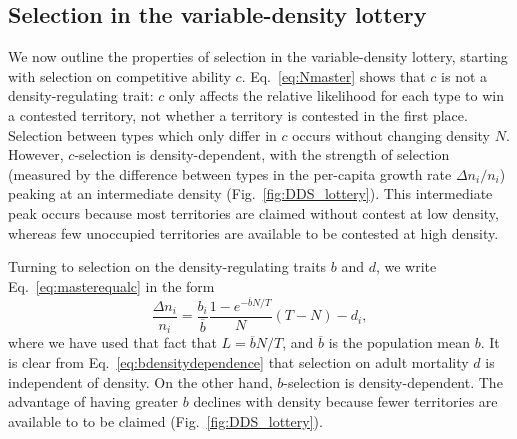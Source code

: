 \documentclass[12pt]{article}
\begin{document}
\subsection*{Selection in the variable-density lottery}

We now outline the properties of selection in the variable-density lottery, starting with selection on competitive ability $c$. Eq.~\eqref{eq:Nmaster} shows that $c$ is not a density-regulating trait: $c$ only affects the relative likelihood for each type to win a contested territory, not whether a territory is contested in the first place. Selection between types which only differ in $c$ occurs without changing density $N$. However, $c$-selection is density-dependent, with the strength of selection (measured by the difference between types in the per-capita growth rate $\Delta n_i/n_i$) peaking at an intermediate density (Fig.~\ref{fig:DDS_lottery}). This intermediate peak occurs because most territories are claimed without contest at low density, whereas few unoccupied territories are available to be contested at high density. 

Turning to selection on the density-regulating traits $b$ and $d$, we write Eq.~\eqref{eq:masterequalc} in the form
\begin{equation}
\frac{\Delta n_i}{n_i} = \frac{b_i}{\overline{b}}\frac{1-e^{-\overline{b}N/T}}{N}(T-N)-d_i, \label{eq:bdensitydependence}
\end{equation}
where we have used that fact that $L=\overline{b}N/T$, and $\overline{b}$ is the population mean $b$. It is clear from Eq.~\eqref{eq:bdensitydependence} that selection on adult mortality $d$ is independent of density. On the other hand, $b$-selection is density-dependent. The advantage of having greater $b$ declines with density because fewer territories are available to to be claimed (Fig.~\ref{fig:DDS_lottery}). 
\end{document}
